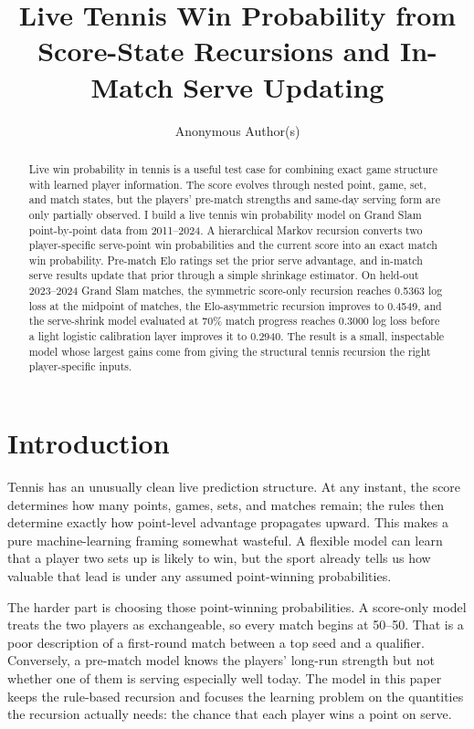 \documentclass{article} %
\title{Live Tennis Win Probability from Score-State Recursions and In-Match Serve Updating}
\author{Anonymous Author(s)}
\begin{document}
\maketitle

\begin{abstract}
Live win probability in tennis is a useful test case for combining exact game
structure with learned player information. The score evolves through nested
point, game, set, and match states, but the players' pre-match strengths and
same-day serving form are only partially observed. I build a live tennis win
probability model on Grand Slam point-by-point data from 2011--2024. A
hierarchical Markov recursion converts two player-specific serve-point win
probabilities and the current score into an exact match win probability.
Pre-match Elo ratings set the prior serve advantage, and in-match serve results
update that prior through a simple shrinkage estimator. On held-out 2023--2024
Grand Slam matches, the symmetric score-only recursion reaches 0.5363 log loss
at the midpoint of matches, the Elo-asymmetric recursion improves to 0.4549, and
the serve-shrink model evaluated at 70\% match progress reaches 0.3000 log loss
before a light logistic calibration layer improves it to 0.2940. The result is a
small, inspectable model whose largest gains come from giving the structural
tennis recursion the right player-specific inputs.
\end{abstract}

\section{Introduction}

Tennis has an unusually clean live prediction structure. At any instant, the
score determines how many points, games, sets, and matches remain; the rules
then determine exactly how point-level advantage propagates upward. This makes a
pure machine-learning framing somewhat wasteful. A flexible model can learn that
a player two sets up is likely to win, but the sport already tells us how
valuable that lead is under any assumed point-winning probabilities.

The harder part is choosing those point-winning probabilities. A score-only
model treats the two players as exchangeable, so every match begins at 50--50.
That is a poor description of a first-round match between a top seed and a
qualifier. Conversely, a pre-match model knows the players' long-run strength
but not whether one of them is serving especially well today. The model in this
paper keeps the rule-based recursion and focuses the learning problem on the
quantities the recursion actually needs: the chance that each player wins a
point on serve.
\end{document}

